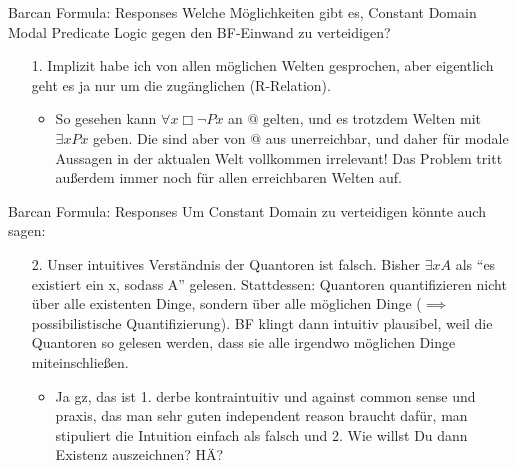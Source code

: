 \documentclass[12pt]{beamer}
\begin{document}
\begin{frame}{Barcan Formula: Responses}
  Welche Möglichkeiten gibt es, Constant Domain Modal Predicate Logic
  gegen den BF-Einwand zu verteidigen?
  \begin{enumerate}[<+->]
  \item[1.] Implizit habe ich von allen möglichen Welten gesprochen,
    aber eigentlich geht es ja nur um die zugänglichen (R-Relation).
    \begin{itemize}[<+->]
    \item So gesehen kann $\forall x \Box \neg Px$ an $@$ gelten, und
      es trotzdem Welten mit $\exists x Px$ geben. Die sind aber von
      $@$ aus unerreichbar, und daher für modale Aussagen in der
      aktualen Welt vollkommen irrelevant! Das Problem tritt außerdem
      immer noch für allen erreichbaren Welten auf.
    \end{itemize}
  \end{enumerate}
\end{frame}
\begin{frame}{Barcan Formula: Responses}
  Um Constant Domain zu verteidigen könnte auch sagen:
  \begin{enumerate}[<+->]
  \item[2.] Unser intuitives Verständnis der Quantoren ist
    falsch. Bisher $\exists x A$ als ``es existiert ein x, sodass A''
    gelesen. Stattdessen: Quantoren quantifizieren nicht über alle
    existenten Dinge, sondern über alle möglichen Dinge ($\implies$
    possibilistische Quantifizierung). BF klingt dann intuitiv
    plausibel, weil die Quantoren so gelesen werden, dass sie alle
    irgendwo möglichen Dinge miteinschließen.
    \begin{itemize}[<+->]
    \item Ja gz, das ist 1. derbe kontraintuitiv und against common
      sense und praxis, das man sehr guten independent reason braucht
      dafür, man stipuliert die Intuition einfach als falsch und
      2. Wie willst Du dann Existenz auszeichnen? HÄ?
    \end{itemize}
  \end{enumerate}
\end{frame}
\end{document}
